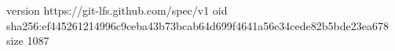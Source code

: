 version https://git-lfs.github.com/spec/v1
oid sha256:ef445261214996c9ceba43b73bcab64d699f4641a56e34cede82b5bde23ea678
size 1087
